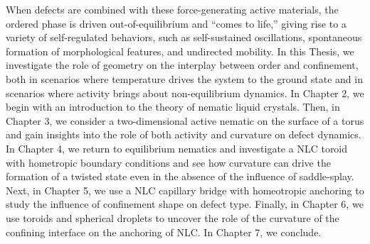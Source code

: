 When defects are combined with these force-generating active materials, the ordered phase is driven out-of-equilibrium and ``comes to life,'' giving rise to a variety of self-regulated behaviors, such as self-sustained oscillations, spontaneous formation of morphological features, and undirected mobility.
In this Thesis, we investigate the role of geometry on the interplay between order and confinement, both in scenarios where temperature drives the system to the ground state and in scenarios where activity brings about non-equilibrium dynamics.
In Chapter 2, we begin with an introduction to the theory of nematic liquid crystals.
Then, in Chapter 3, we consider a two-dimensional active nematic on the surface of a torus and gain insights into the role of both activity and curvature on defect dynamics.
In Chapter 4, we return to equilibrium nematics and investigate a NLC toroid with hometropic boundary conditions and see how curvature can drive the formation of a twisted state even in the absence of the influence of saddle-splay.
Next, in Chapter 5, we use a NLC capillary bridge with homeotropic anchoring to study the influence of confinement shape on defect type.
Finally, in Chapter 6, we use toroids and spherical droplets to uncover the role of the curvature of the confining interface on the anchoring of NLC.
In Chapter 7, we conclude.
